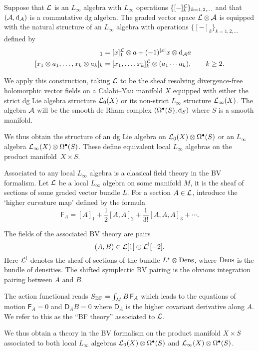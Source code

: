 \parsec
Suppose that $\mathcal L$ is an $L_\infty$ algebra with $L_\infty$ operations $\{[-]^\mathcal L_k\}_{k=1,2,\ldots}$ and that $(\mathcal A, {\rm d}_\mathcal A)$ is a commutative dg algebra. 
The graded vector space $\mathcal L \otimes \mathcal A$ is equipped with the natural structure of an $L_\infty$ algebra with operations $\{[-]_k\}_{k=1,2,\ldots}$ defined by
\begin{align*}
[x \otimes a]_1 & = [x]^\cL_1 \otimes a + (-1)^{|x|} x \otimes \d_\cA a \\
[x_1 \otimes a_1, \ldots , x_k \otimes a_k]_k & = [x_1,\ldots,x_k]^\cL_k \otimes (a_1 \cdots a_k), \qquad k \geq 2 .
\end{align*}

We apply this construction, taking $\mathcal L$ to be the sheaf resolving divergence-free holomorphic vector fields on a Calabi--Yau manifold $X$ equipped with either the strict dg Lie algebra structure $\mathcal L_0(X)$ or its non-strict $L_\infty$ structure $\mathcal L_\infty (X)$. 
The algebra $\mathcal A$ will be the smooth de Rham complex $(\Omega^\bullet(S) , {\rm d}_S)$ where $S$ is a smooth manifold. 

We thus obtain the structure of an dg Lie algebra on $\mathcal L_0(X) \otimes \Omega^{\bullet}(S)$ or an $L_\infty$ algebra $\mathcal L_\infty(X) \otimes \Omega^\bullet(S)$.
These define equivalent local $L_\infty$ algebras on the product manifold~$X \times S$. 

\parsec[s:bf]

Associated to any local $L_\infty$ algebra is a classical field theory in the BV formalism.
Let $\mathcal L$ be a local $L_\infty$ algebra on some manifold $M$, it is the sheaf of sections of some graded vector bundle $L$. 
For a section $A \in \mathcal L$, introduce the `higher curvature map' defined by the formula
\[
\mathsf{F}_A = [A]_1 + \frac12 [A,A]_2 + \frac{1}{3!} [A,A,A]_3 + \cdots .
\]

The fields of the associated BV theory are pairs
\[
  (A, B) \in \mathcal L[1] \oplus \mathcal L^{!}[-2] .
\]
Here $\mathcal L^!$ denotes the sheaf of sections of the bundle $L^* \otimes {\rm Dens}$, where ${\rm Dens}$ is the bundle of densities. 
The shifted symplectic BV pairing is the obvious integration pairing between $A$ and $B$. 

The action functional reads $S_{\rm BF} = \int_M B \, \mathsf{F}_{A}$ which leads to the equations of motion $\mathsf{F}_{A} = 0$ and $\mathsf{D}_A B= 0$ where $\mathsf{D}_A$ is the higher covariant derivative along $A$. 
We refer to this as the ``BF theory'' associated to $\mathcal L$.

We thus obtain a theory in the BV formalism on the product manifold $X \times S$ associated to both local $L_\infty$ algebras $\mathcal L_0(X) \otimes \Omega^{\bullet}(S)$ and $\mathcal L_\infty(X) \otimes \Omega^\bullet(S)$.

